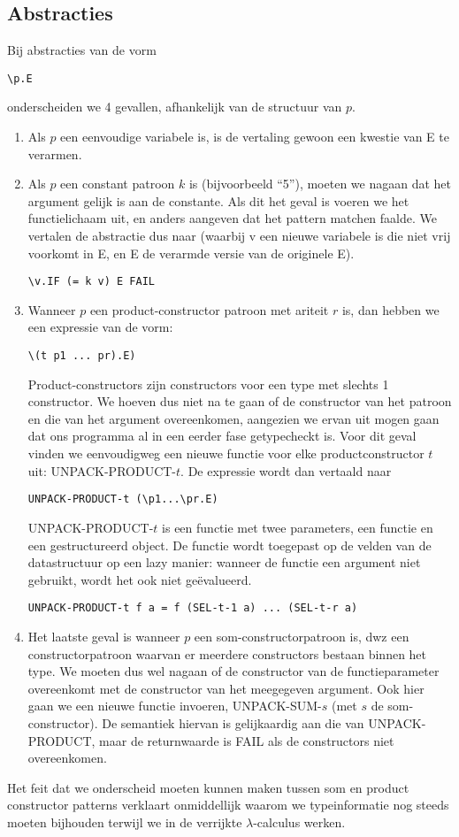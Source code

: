 \documentclass[a4paper,10pt]{article}
\begin{document}
\subsection{Abstracties}
Bij abstracties van de vorm
\begin{verbatim}
\p.E
\end{verbatim}
onderscheiden we 4 gevallen, afhankelijk van de structuur van $p$.
\begin{enumerate}
\item Als $p$ een eenvoudige variabele is, is de vertaling gewoon een kwestie van E te verarmen.
\item Als $p$ een constant patroon $k$ is (bijvoorbeeld ``5''), moeten we nagaan dat het argument gelijk is aan de constante. Als dit het geval is voeren we het functielichaam uit, en anders aangeven dat het pattern matchen faalde. We vertalen de abstractie dus naar (waarbij v een nieuwe variabele is die niet vrij voorkomt in E, en E de verarmde versie van de originele E).
\begin{verbatim}
\v.IF (= k v) E FAIL
\end{verbatim}
\item Wanneer $p$ een product-constructor patroon met ariteit $r$ is, dan hebben we een expressie van de vorm:
\begin{verbatim}
\(t p1 ... pr).E)
\end{verbatim}
Product-constructors zijn constructors voor een type met slechts 1 constructor. We hoeven dus niet na te gaan of de constructor van het patroon en die van het argument overeenkomen, aangezien we ervan uit mogen gaan dat ons programma al in een eerder fase getypecheckt is.
Voor dit geval vinden we eenvoudigweg een nieuwe functie voor elke productconstructor $t$ uit: UNPACK-PRODUCT-$t$. De expressie wordt dan vertaald naar
\begin{verbatim}
UNPACK-PRODUCT-t (\p1...\pr.E)
\end{verbatim}
UNPACK-PRODUCT-$t$ is een functie met twee parameters, een functie en een gestructureerd object. De functie wordt toegepast op de velden van de datastructuur op een lazy manier: wanneer de functie een argument niet gebruikt, wordt het ook niet ge{\"e}valueerd.
\begin{verbatim}
UNPACK-PRODUCT-t f a = f (SEL-t-1 a) ... (SEL-t-r a)
\end{verbatim}
\item Het laatste geval is wanneer $p$ een som-constructorpatroon is, dwz een constructorpatroon waarvan er meerdere constructors bestaan binnen het type. We moeten dus wel nagaan of de constructor van de functieparameter overeenkomt met de constructor van het meegegeven argument.
  Ook hier gaan we een nieuwe functie invoeren, UNPACK-SUM-$s$ (met $s$ de som-constructor). De semantiek hiervan is gelijkaardig aan die van UNPACK-PRODUCT, maar de returnwaarde is FAIL als de constructors niet overeenkomen.
\end{enumerate}
Het feit dat we onderscheid moeten kunnen maken tussen som en product constructor patterns verklaart onmiddellijk waarom we typeinformatie nog steeds moeten bijhouden terwijl we in de verrijkte $\lambda$-calculus werken.
\end{document}
